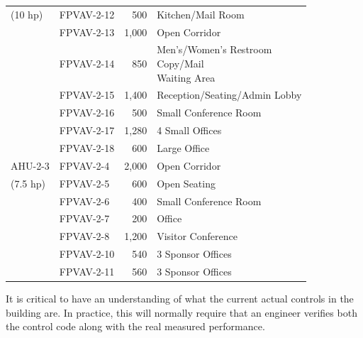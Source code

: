 \begin{table}
\begin{tabular}{@{}llrl@{}}
(10 hp)  & FPVAV-2-12 & 500   & Kitchen/Mail Room                                                        \\ \cmidrule(r){2-4}
         & FPVAV-2-13 & 1,000 & Open Corridor                                                            \\ \cmidrule(r){2-4}
         & FPVAV-2-14 & 850   & \pbox{\textwidth}{Men's/Women's Restroom \\ Copy/Mail  \\ Waiting Area } \\ \cmidrule(r){2-4}
         & FPVAV-2-15 & 1,400 & Reception/Seating/Admin Lobby                                            \\ \cmidrule(r){2-4}
         & FPVAV-2-16 & 500   & Small Conference Room                                                    \\ \cmidrule(r){2-4}
         & FPVAV-2-17 & 1,280 & 4 Small Offices                                                          \\ \cmidrule(r){2-4}
         & FPVAV-2-18 & 600   & Large Office                                                             \\ \midrule
AHU-2-3  & FPVAV-2-4  & 2,000 & Open Corridor                                                            \\ \cmidrule(r){2-4}
(7.5 hp) & FPVAV-2-5  & 600   & Open Seating                                                             \\ \cmidrule(r){2-4}
         & FPVAV-2-6  & 400   & Small Conference Room                                                    \\ \cmidrule(r){2-4}
         & FPVAV-2-7  & 200   & Office                                                                   \\ \cmidrule(r){2-4}
         & FPVAV-2-8  & 1,200 & Visitor Conference                                                       \\ \cmidrule(r){2-4}
         & FPVAV-2-10 & 540   & 3 Sponsor Offices                                                        \\ \cmidrule(r){2-4}
         & FPVAV-2-11 & 560   & 3 Sponsor Offices                                                        \\ \bottomrule
\end{tabular}
\end{table}

It is critical to have an understanding of what the current actual controls in
the building are. In practice, this will normally require that an engineer
verifies both the control code along with the real measured performance.

